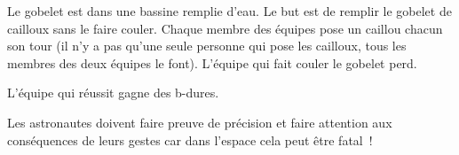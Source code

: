 \documentclass{grand-jeu}
\begin{document}
\begin{liste-materiel}
\end{liste-materiel}

\begin{regles}
Le gobelet est dans une bassine remplie d’eau. Le but est de remplir le gobelet de cailloux sans le faire couler. Chaque membre des équipes pose un caillou chacun son tour (il n’y a pas qu’une seule personne qui pose les cailloux, tous les membres des deux équipes le font). L’équipe qui fait couler le gobelet perd.

L'équipe qui réussit gagne des b-dures.
\end{regles}

\begin{imaginaire}
Les astronautes doivent faire preuve de précision et faire attention aux conséquences de leurs gestes car dans l'espace cela peut être fatal ! 
\end{imaginaire}

\begin{moments-stop}
\end{moments-stop}
\end{document}

